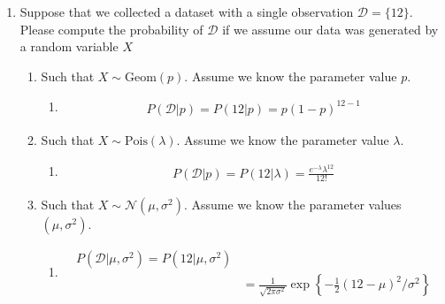 \documentclass[krantz1,ChapterTOCs]{krantz}
\begin{document}
\begin{enumerate}
    \item Suppose that we collected a dataset with a single observation $\mathcal{D} = \{ 12 \}$. Please compute the probability of $\mathcal{D}$ if we assume our data was generated by a random variable $X$
    \begin{enumerate}
        \item Such that $X \sim \text{Geom}(p)$. Assume we know the parameter value $p$.
        
        \begin{enumerate}
            \item {\color{red} 
                \begin{align}
                    P(\mathcal{D} | p) = P(12 | p) =  p (1-p)^{12-1}
                \end{align}
            }
        \end{enumerate}
        
        \item Such that $X \sim \text{Pois}(\lambda)$. Assume we know the parameter value $\lambda$. 
        
        \begin{enumerate}
            \item {\color{red} 
                \begin{align}
                    P(\mathcal{D} | p) = P(12 | \lambda) = \frac{e^{-\lambda} \lambda^{12}}{12!}
                \end{align}
            }
        \end{enumerate}
 
        \item Such that $X \sim \mathcal{N}(\mu,\sigma^{2})$.
        Assume we know the parameter values $(\mu, \sigma^{2})$.
        
        \begin{enumerate}
            \item {\color{red}
            \begin{align*}
                    P(\mathcal{D} | \mu, \sigma^{2}) = P(12 | \mu, \sigma^{2})\\
                    &= \frac{1}{\sqrt{2 \pi \sigma^{2}}} \exp\left\{ -\frac{1}{2}\left( 12 - \mu\right)^{2}  / \sigma^{2}\right\}
                \end{align*}
            }
        \end{enumerate}
        
    \end{enumerate}
    

\end{enumerate}
\end{document}
